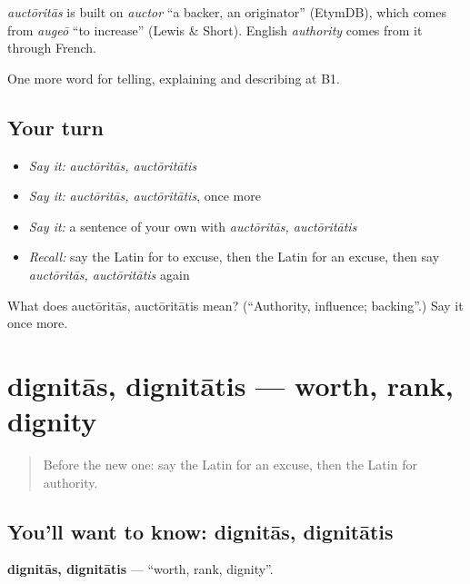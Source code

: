 \begin{cousinweb}
\emph{auctōritās} is built on \emph{auctor} \textquotedblleft{}a backer, an originator\textquotedblright{} (EtymDB), which comes from \emph{augeō} \textquotedblleft{}to increase\textquotedblright{} (Lewis \& Short). English \emph{authority} comes from it through French.
\end{cousinweb}

\begin{grammarlens}[title={What you've built}]
One more word for telling, explaining and describing at B1.
\end{grammarlens}

\subsection*{Your turn}
\begin{itemize}
\raggedright
  \item \emph{Say it:} \emph{auctōritās, auctōritātis}
  \item \emph{Say it:} \emph{auctōritās, auctōritātis}, once more
  \item \emph{Say it:} a sentence of your own with \emph{auctōritās, auctōritātis}
  \item \emph{Recall:} say the Latin for to excuse, then the Latin for an excuse, then say \emph{auctōritās, auctōritātis} again
\end{itemize}

\begin{tcolorbox}[breakable,colback=teal!4,colframe=teal!35!black,title={Before you move on}]
What does auctōritās, auctōritātis mean? (\textquotedblleft{}Authority, influence; backing\textquotedblright{}.) Say it once more.
\end{tcolorbox}
\section[dignitās, dignitātis]{dignitās, dignitātis — worth, rank, dignity}

\label{lesson:LA-C370-dignitas}



\begin{quote}
Before the new one: say the Latin for an excuse, then the Latin for authority.
\end{quote}

\subsection*{You'll want to know: dignitās, dignitātis}
\textbf{dignitās, dignitātis} — \textquotedblleft{}worth, rank, dignity\textquotedblright{}.


